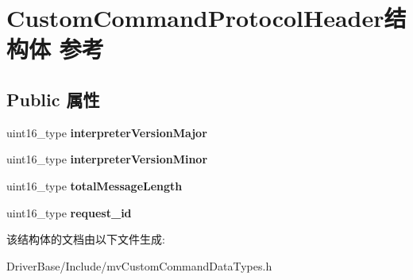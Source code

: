 \hypertarget{struct_custom_command_protocol_header}{\section{Custom\+Command\+Protocol\+Header结构体 参考}
\label{struct_custom_command_protocol_header}
}
\subsection*{Public 属性}
\begin{DoxyCompactItemize}
\item 
\hypertarget{struct_custom_command_protocol_header_ad7d1b1627924256c9a1a66ccde77e2a6}{uint16\+\_\+type {\bfseries interpreter\+Version\+Major}}\label{struct_custom_command_protocol_header_ad7d1b1627924256c9a1a66ccde77e2a6}

\item 
\hypertarget{struct_custom_command_protocol_header_a888df4ea63f8fa8a2369021f81cc4f83}{uint16\+\_\+type {\bfseries interpreter\+Version\+Minor}}\label{struct_custom_command_protocol_header_a888df4ea63f8fa8a2369021f81cc4f83}

\item 
\hypertarget{struct_custom_command_protocol_header_a5ccb9448654fe7dfe346c294a6b9425b}{uint16\+\_\+type {\bfseries total\+Message\+Length}}\label{struct_custom_command_protocol_header_a5ccb9448654fe7dfe346c294a6b9425b}

\item 
\hypertarget{struct_custom_command_protocol_header_a830b58037b5354f63bd60744ece203ec}{uint16\+\_\+type {\bfseries request\+\_\+id}}\label{struct_custom_command_protocol_header_a830b58037b5354f63bd60744ece203ec}

\end{DoxyCompactItemize}


该结构体的文档由以下文件生成\+:\begin{DoxyCompactItemize}
\item 
Driver\+Base/\+Include/mv\+Custom\+Command\+Data\+Types.\+h\end{DoxyCompactItemize}
